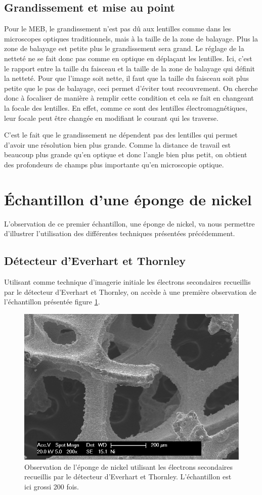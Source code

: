 \documentclass[a4paper,12pt]{article}
\newcommand\ett{Everhart et Thornley\xspace}
\begin{document}
\subsection{Grandissement et mise au point}
Pour le MEB, le grandissement n'est pas dû aux lentilles comme dans les microscopes optiques traditionnels, mais à la taille de la zone de balayage. Plus la zone de balayage est petite plus le grandissement sera grand. Le réglage de la netteté ne se fait donc pas comme en optique en déplaçant les lentilles. Ici, c'est le rapport entre la taille du faisceau et la taille de la zone de balayage qui définit la netteté. Pour que l'image soit nette, il faut que la taille du faisceau soit plus petite que le pas de balayage, ceci permet d'éviter tout recouvrement. On cherche donc à focaliser de manière à remplir cette condition et cela se fait en changeant la focale des lentilles. En effet, comme ce sont des lentilles électromagnétiques, leur focale peut être changée en modifiant le courant qui les traverse.


C'est le fait que le grandissement ne dépendent pas des lentilles qui permet d'avoir une résolution bien plus grande. Comme la distance de travail est beaucoup plus grande qu'en optique et donc l'angle bien plus petit, on obtient des profondeurs de champs plus importante qu'en microscopie optique. 



\section{Échantillon d'une éponge de nickel}

L'observation de ce premier échantillon, une éponge de nickel, va nous permettre d'illustrer l'utilisation des différentes techniques présentées précédemment.

\subsection{Détecteur d'\ett}

Utilisant comme technique d'imagerie initiale les électrons secondaires recueillis par le détecteur d'\ett,
on accède à une première observation de l'échantillon présentée figure \ref{fig:ni_es}. 

\begin{figure}[h]
\centering
\includegraphics[width = 0.7 \textwidth]{images/ni_es.png}
\caption{Observation de l'éponge de nickel utilisant les électrons secondaires recueillis par le détecteur d'\ett. L'échantillon est ici grossi 200 fois.}
\label{fig:ni_es}
\end{figure}
\end{document}
